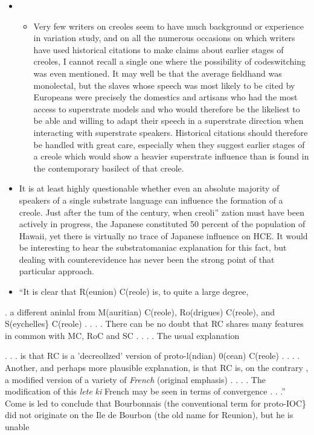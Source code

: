 \begin{itemize}
\begin{itemize}
\begin{itemize}
\begin{itemize}
\begin{itemize}
\item %
\begin{itemize}
\item Very few writers on creoles seem to have much background or experience in variation study, and on all the numerous occasions on which writers have used historical citations to make claims about earlier stages of creoles, I cannot recall a single one where the possi\-bility of codeswitching was even mentioned. It may well be that the average fieldhand was monolectal, but the slaves whose speech was most likely to be cited by Europeans were precisely the domestics and artisans who had the most access to superstrate models and who would therefore be the likeliest to be able and willing to adapt their speech in a superstrate direction when interacting with superstrate speakers. Historical citations should therefore be handled with great care, especially when they suggest earlier stages of a creole which would show a heavier superstrate influence than is found in the con\-temporary basilect of that creole.
\end{itemize}
\end{itemize}
\begin{itemize}
\item It is at least highly questionable whether even an absolute majority of speakers of a single substrate language can influence the formation of a creole. Just after the tum of the century, when creoli'' zation must have been actively in progress, the Japanese constituted 50 percent of the population of Hawaii, yet there is virtually no trace of Japanese influence on HCE. It would be interesting to hear the substratomaniac explanation for this fact, but dealing with counter\-evidence has never been the strong point of that particular approach.
\item ``It is clear that R(eunion) C(reole) is, to quite a large degree,
\end{itemize}

. a different aninlal from M(auritian) C(reole), Ro(drigues) C(reole), and S(eychelles\} C(reole) . . . . There can be no doubt that RC shares many features in common with MC, RoC and SC . . . . The usual explanation

. . . is that RC is a 'decreollzed' version of proto-l(ndian) 0(cean) C(reole) . . . . Another, and perhaps more plausible explanation, is that RC is, on the contrary , a modified version of a variety of \textit{French} (original emphasis) . . . . The modification of this \textit{lete} \textit{ki} French may be seen in terms of convergence . . .'' Come is led to conclude that Bourbonnais (the conventional term for proto-IOC\} did not originate on the Ile de Bourbon (the old name for Reunion), but he is unable


\end{itemize}
\end{itemize}
\end{itemize}
\end{itemize}
